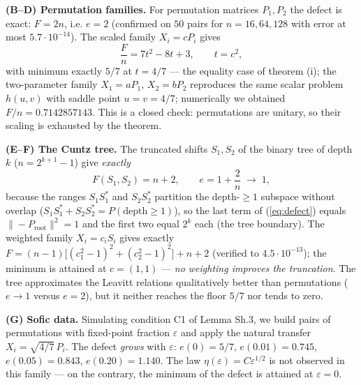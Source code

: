 \documentclass[11pt,a4paper]{article}
\begin{document}
\textbf{(B--D) Permutation families.} For permutation matrices $P_1, P_2$ the
defect is exact: $F = 2n$, i.e. $e = 2$ (confirmed on $50$ pairs for
$n = 16, 64, 128$ with error at most $5.7\cdot10^{-14}$). The scaled family
$X_i = cP_i$ gives
\begin{equation}\label{eq:scaled}
\frac{F}{n} = 7t^2 - 8t + 3, \qquad t = c^2,
\end{equation}
with minimum exactly $5/7$ at $t = 4/7$ --- the equality case of theorem (i);
the two-parameter family $X_1 = aP_1$, $X_2 = bP_2$ reproduces the same scalar
problem $h(u,v)$ with saddle point $u = v = 4/7$; numerically we obtained
$F/n = 0.7142857143$. This is a closed check: permutations are unitary, so
their scaling is exhausted by the theorem.

\textbf{(E--F) The Cuntz tree.} The truncated shifts $S_1, S_2$ of the binary
tree of depth $k$ ($n = 2^{k+1}-1$) give \emph{exactly}
\begin{equation}\label{eq:tree}
F(S_1, S_2) = n + 2, \qquad e = 1 + \frac{2}{n} \;\to\; 1,
\end{equation}
because the ranges $S_1S_1^*$ and $S_2S_2^*$ partition the depth-$\ge 1$
subspace without overlap ($S_1S_1^* + S_2S_2^* = P(\text{depth} \ge 1)$), so
the last term of (\ref{eq:defect}) equals $\|-P_{\mathrm{root}}\|^2 = 1$ and the
first two equal $2^k$ each (the tree boundary). The weighted family
$X_i = c_iS_i$ gives exactly $F = (n-1)\big[(c_1^2-1)^2 + (c_2^2-1)^2\big] + n + 2$
(verified to $4.5\cdot10^{-13}$); the minimum is attained at $c = (1,1)$ ---
\emph{no weighting improves the truncation}. The tree approximates the Leavitt
relations qualitatively better than permutations ($e \to 1$ versus $e = 2$),
but it neither reaches the floor $5/7$ nor tends to zero.

\textbf{(G) Sofic data.} Simulating condition C1 of Lemma Sh.3, we build pairs
of permutations with fixed-point fraction $\varepsilon$ and apply the natural
transfer $X_i = \sqrt{4/7}\,P_i$. The defect \emph{grows} with $\varepsilon$:
$e(0) = 5/7$, $e(0.01) = 0.745$, $e(0.05) = 0.843$, $e(0.20) = 1.140$. The law
$\eta(\varepsilon) = C\varepsilon^{1/2}$ is not observed in this family ---
on the contrary, the minimum of the defect is attained at $\varepsilon = 0$.
\end{document}
